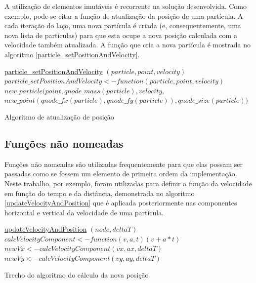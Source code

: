 \documentclass[rel_mlp]{iiufrgs}
\begin{document}
    A utilização de elementos imutáveis é recorrente na solução desenvolvida. Como exemplo, pode-se citar a função de atualização da posição de uma partícula. A cada iteração do laço, uma nova partícula é criada (e, consequentemente, uma nova lista de partículas) para que esta ocupe a nova posição calculada com a velocidade também atualizada. A função que cria a nova partícula é mostrada no algoritmo \ref{particle_setPositionAndVelocity}.

    \begin{algorithm}
	\label{particle_setPositionAndVelocity}
    \underline{particle{\_}setPositionAndVelocity} $(particle, point, velocity)$\;
  		$particle{\_}setPositionAndVelocity <- function (particle, point, velocity) $\;
    	$new{\_}particle(point, qnode{\_}mass(particle), velocity, $\;
        $new{\_}point(qnode{\_}fx(particle), qnode{\_}fy(particle)), qnode{\_}size(particle)) $\;
\caption{Algoritmo de atualização de posição}
\end{algorithm}

    \subsection{Funções não nomeadas}

    Funções não nomeadas são utilizadas frequentemente para que elas possam ser passadas como se fossem um elemento de primeira ordem da implementação. Neste trabalho, por exemplo, foram utilizadas para definir a função da velocidade em função do tempo e da distância, demonstrada no algoritmo \ref{updateVelocityAndPosition} que é aplicada posteriormente nas componentes horizontal e vertical da velocidade de uma partícula.

    \begin{algorithm}
	\label{updateVelocityAndPosition}
    \underline{updateVelocityAndPosition} $(node, deltaT)$\;
  		$calcVelocityComponent <- function (v, a, t) (v + a*t)$\;
    	$newVx <- calcVelocityComponent(vx, ax, deltaT)$\;
    	$newVy <- calcVelocityComponent(vy, ay, deltaT)$\;

\caption{Trecho do algoritmo do cálculo da nova posição}
\end{algorithm}
\end{document}

